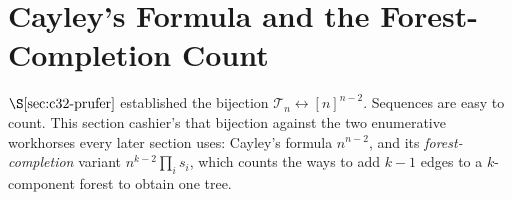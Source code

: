 \section{Cayley's Formula and the Forest-Completion Count}\label{sec:c32-cayley}

\begin{previouslybox}
\(\secref{c32-prufer}\) established the bijection \(\mathcal{T}_n
\leftrightarrow [n]^{n-2}\).  Sequences are easy to count.  This section
cashier's that bijection against the two enumerative workhorses every later
section uses: Cayley's formula \(n^{n-2}\), and its \emph{forest-completion}
variant \(n^{k-2}\prod_i s_i\), which counts the ways to add \(k-1\) edges to
a \(k\)-component forest to obtain one tree.
\end{previouslybox}

